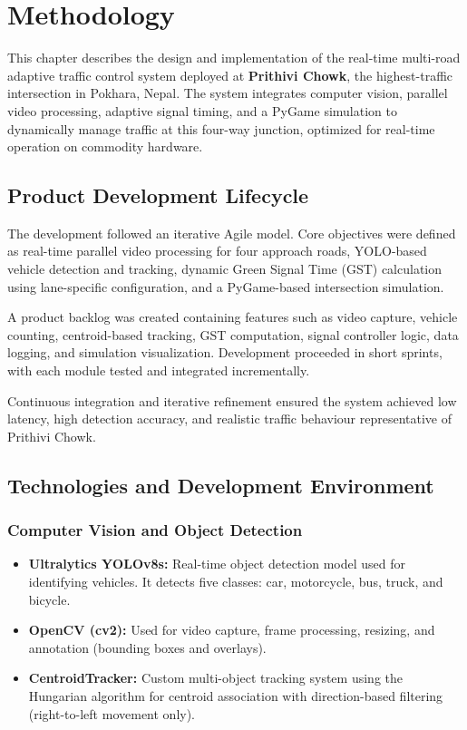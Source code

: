 \chapter{Methodology}

This chapter describes the design and implementation of the real-time multi-road adaptive traffic control system deployed at \textbf{Prithivi Chowk}, the highest-traffic intersection in Pokhara, Nepal. The system integrates computer vision, parallel video processing, adaptive signal timing, and a PyGame simulation to dynamically manage traffic at this four-way junction, optimized for real-time operation on commodity hardware.

\section{Product Development Lifecycle}

The development followed an iterative Agile model. Core objectives were defined as real-time parallel video processing for four approach roads, YOLO-based vehicle detection and tracking, dynamic Green Signal Time (GST) calculation using lane-specific configuration, and a PyGame-based intersection simulation.

A product backlog was created containing features such as video capture, vehicle counting, centroid-based tracking, GST computation, signal controller logic, data logging, and simulation visualization. Development proceeded in short sprints, with each module tested and integrated incrementally.

Continuous integration and iterative refinement ensured the system achieved low latency, high detection accuracy, and realistic traffic behaviour representative of Prithivi Chowk.

\section{Technologies and Development Environment}

\subsection{Computer Vision and Object Detection}
\begin{itemize}
    \item \textbf{Ultralytics YOLOv8s:} Real-time object detection model used for identifying vehicles. It detects five classes: car, motorcycle, bus, truck, and bicycle.
    \item \textbf{OpenCV (cv2):} Used for video capture, frame processing, resizing, and annotation (bounding boxes and overlays).
    \item \textbf{CentroidTracker:} Custom multi-object tracking system using the Hungarian algorithm for centroid association with direction-based filtering (right-to-left movement only).
\end{itemize}

